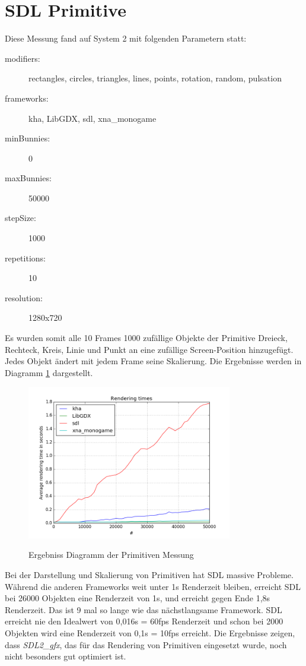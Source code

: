 \section{SDL Primitive}
Diese Messung fand auf System 2 mit folgenden Parametern statt:
\begin{description}
\item[modifiers:] rectangles, circles, triangles, lines, points, rotation, random, pulsation
\item[frameworks:] kha, LibGDX, sdl, xna\_monogame
\item[minBunnies:] 0
\item[maxBunnies:] 50000
\item[stepSize:] 1000
\item[repetitions:] 10
\item[resolution:] 1280x720
\end{description}
Es wurden somit alle 10 Frames 1000 zufällige Objekte der Primitive Dreieck, Rechteck, Kreis, Linie und Punkt an eine zufällige Screen-Position hinzugefügt. Jedes Objekt ändert mit jedem Frame seine Skalierung. Die Ergebnisse werden in Diagramm \ref{dia:sdl_primitives} dargestellt.
\begin{figure}
\caption{Ergebniss Diagramm der Primitiven Messung}
\centering
\includegraphics[width=0.8\textwidth]{sdl_primitives}
\label{dia:sdl_primitives}
\end{figure}
Bei der Darstellung und Skalierung von Primitiven hat SDL massive Probleme. Während die anderen Frameworks weit unter 1s Renderzeit bleiben, erreicht SDL bei 26000 Objekten eine Renderzeit von 1s, und erreicht gegen Ende 1,8s Renderzeit. Das ist 9 mal so lange wie das nächstlangsame Framework. SDL erreicht nie den Idealwert von 0,016s = 60fps Renderzeit und schon bei 2000 Objekten wird eine Renderzeit von 0,1s = 10fps erreicht. Die Ergebnisse zeigen, dass \textit{SDL2\_gfx}, das für das Rendering von Primitiven eingesetzt wurde, noch nicht besonders gut optimiert ist.\\

